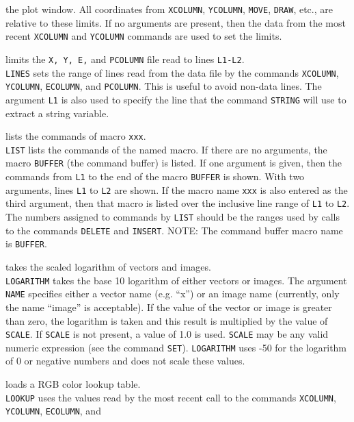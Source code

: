 	the plot window.  All coordinates from
	{\tt XCOLUMN},
	{\tt YCOLUMN},
	{\tt MOVE},
	{\tt DRAW}, etc.,
	are relative to these limits.  If no
	arguments are present, then the data from the most recent
	{\tt XCOLUMN} and
	{\tt YCOLUMN}
	commands are used to set the limits.
\item [{\tt LINES L1 L2 } --] limits the {\tt X, Y, E,} and {\tt PCOLUMN} file read to lines {\tt L1-L2}.\\
	{\tt LINES} sets the range of lines read from the
	data file by the commands
	{\tt XCOLUMN},
	{\tt YCOLUMN},
	{\tt ECOLUMN}, and
	{\tt PCOLUMN}.
	This is useful to avoid non-data lines.  The argument {\tt L1}
	is also used to specify the line that the command
	{\tt STRING}
	will use to extract a string variable.
\item [{\tt LIST [L1 [L2 [xxx]]] } --] lists the commands of macro {\tt xxx}.\\
	{\tt LIST} lists the commands of the named macro.  If there
	are no arguments, the macro {\tt BUFFER}
	(the command buffer) is listed.  If one argument is given, then
	the commands from {\tt L1} to the end of the macro
	{\tt BUFFER} is shown.  With two
	arguments, lines {\tt L1} to {\tt L2} are shown.
	If the macro name {\tt xxx} is also entered as the third
	argument, then that macro is listed over the inclusive line range
	of {\tt L1} to {\tt L2}.  The numbers assigned to
	commands by {\tt LIST} should be the ranges used by calls
	to the commands {\tt DELETE} and
	{\tt INSERT}.
	NOTE: The command buffer macro name is
	{\tt BUFFER}.
\item [{\tt LOGARITHM name [scale] } --] takes the scaled logarithm of vectors and images.\\
	{\tt LOGARITHM} takes the base 10 logarithm of either
	vectors or images.  The argument {\tt NAME} specifies
	either a vector name (e.g. ``x'') or an image name (currently,
	only the name ``image'' is acceptable).  If the value of the
	vector or image is greater than zero, the logarithm is taken
	and this result is multiplied by the value of {\tt SCALE}.
	If {\tt SCALE} is not present, a value of 1.0 is used.
	{\tt SCALE} may be any valid numeric expression (see
	the command {\tt SET}).
	{\tt LOGARITHM} uses -50 for the logarithm
	of 0 or negative numbers and does not scale these values.
\item [{\tt LOOKUP [N] } --] loads a RGB color lookup table.\\
	{\tt LOOKUP} uses the values read by the most recent call to
	the commands {\tt XCOLUMN},
	{\tt YCOLUMN},
	{\tt ECOLUMN}, and
